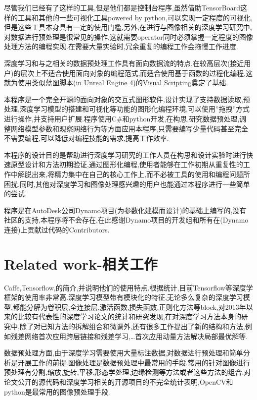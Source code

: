 \documentclass[10pt,journal,compsoc,UTF8]{IEEEtran}
\begin{document}
尽管我们已经有了这样的工具,但是他们都是控制台程序,虽然借助TensorBoard这样的工具和其他的一些可视化工具powered by python,可以实现一定程度的可视化,但是这些工具本身具有一定的使用门槛,另外,在进行与图像相关的深度学习研究中,对数据进行预处理是很常见的操作,这就需要operator同时必须掌握一定程度的图像处理方法的编程实现.在需要大量实验时,冗余重复的编程工作会拖慢工作进度.

深度学习和与之相关的数据预处理工作具有面向数据流的特点,在较高层次(接近用户)的层次上不适合使用面向对象的编程范式,而适合使用基于函数的过程化编程,这就为使用类似蓝图脚本(in Unreal Engine 4)的Visual Scripting奠定了基础.

本程序是一个完全开源的面向对象的交互式图形软件,设计实现了支持数据读取,预处理,深度学习模型的搭建和可视化等功能的图形化编程环境,可以使用”拖拽”方式进行操作,并支持用户扩展.程序使用C\#和python开发,在构思,研究数据预处理,调整网络模型参数和观察网络行为等方面应用本程序,只需要编写少量代码甚至完全不需要编程,可以降低对编程技能的需求,提高工作效率.

本程序的设计目的是帮助进行深度学习研究的工作人员在构思和设计实验时进行快速原型设计和方法初期验证,通过图形化编程,使用者能够在工作初期从重复性的工作中解脱出来,将精力集中在自己的核心工作上,而不必被工具的使用和编程问题所困扰,同时,其他对深度学习和图像处理感兴趣的用户也能通过本程序进行一些简单的尝试.
	
程序是在AutoDesk公司Dynamo项目(为参数化建模而设计)的基础上编写的,没有社区的支持,本程序将不会存在,在此感谢Dynamo项目的开发组和所有在(Dynamo连接)上贡献过代码的Contributors.



\section{Related work-相关工作}
Caffe,Tensorflow,的简介,并说明他们的使用特点.根据统计,目前Tensorflow等深度学框架的使用率非常高.深度学习模型带有模块化的特征,无论多么复杂的深度学习模型,都能分解为卷积层,全连接层,激活函数,损失函数,正则化方法等block,对2013年以来的比较有代表性的深度学习论文的统计和研究发现,在对深度学习方法本身的研究中,除了对已知方法的拆解组合和微调外,还有很多工作提出了新的结构和方法,例如残差网络首次应用跨层链接和残差学习,…首次应用动量方法解决局部最优解等.

数据预处理方面,由于深度学习需要使用大量标注数据,对数据进行预处理和简单分析是开展工作的前提.图像处理是数据预处理中最常用的手段.常用的针对图像进行预处理有分割,缩放,旋转,平移,形态学处理,边缘检测等方法或者这些方法的组合.对论文公开的源代码和深度学习相关的开源项目的不完全统计表明,OpenCV和python是最常用的图像预处理手段.
\end{document}
